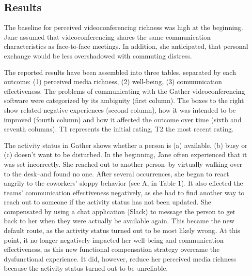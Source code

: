 \documentclass[man]{apa7}
\begin{document}
\subsection{Results}

The baseline for perceived videoconferencing richness was high at the beginning. Jane assumed that videoconferencing shares the same communication characteristics as face-to-face meetings. In addition, she anticipated, that personal exchange would be less overshadowed with commuting distress.

The reported results have been assembled into three tables, separated by each outcome: (1) perceived media richness, (2) well-being, (3) communication effectiveness. The problems of communicating with the Gather videoconferencing software were categorized by its ambiguity (first column). The boxes to the right show related negative experiences (second column), how it was intended to be improved (fourth column) and how it affected the outcome over time (sixth and seventh columns). T1 represents the initial rating, T2 the most recent rating.

The activity status in Gather shows whether a person is (a) available, (b) busy or (c) doesn't want to be disturbed. In the beginning, Jane often experienced that it was set incorrectly. She reached out to another person–by virtually walking over to the desk–and found no one. After several occurrences, she began to react angrily to the coworkers' sloppy behavior (see A, in Table 1). It also effected the teams' communication effectiveness negatively, as she had to find another way to reach out to someone if the activity status has not been updated. She compensated by using a chat application (Slack) to message the person to get back to her when they were actually be available again. This became the new default route, as the activity status turned out to be most likely wrong. At this point, it no longer negatively impacted her well-being and communication effectiveness, as this new functional compensation strategy overcame the dysfunctional experience. It did, however, reduce her perceived media richness because the activity status turned out to be unreliable. 
\end{document}
